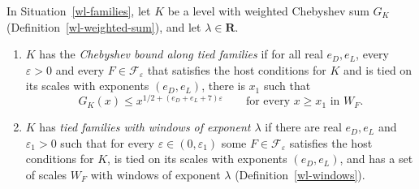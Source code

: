 \begin{definition}\label{wl-family-conditions}
In Situation~\ref{wl-families}, let $K$ be a level with weighted Chebyshev
sum $G_K$ (Definition~\ref{wl-weighted-sum}), and let $\lambda\in\mathbf R$.
\begin{enumerate}
\item $K$ has the \emph{Chebyshev bound along tied families} if for all real
  $e_D,e_L$, every $\varepsilon>0$ and every $F\in\mathcal F_\varepsilon$ that
  satisfies the host conditions for $K$ and is tied on its scales with
  exponents $(e_D,e_L)$, there is $x_1$ such that
  \[
   G_K(x)\leq x^{1/2+(e_D+e_L+7)\varepsilon}\qquad\text{for every }x\geq x_1\text{ in }W_F.
  \]
\item $K$ has \emph{tied families with windows of exponent $\lambda$} if
  there are real $e_D,e_L$ and $\varepsilon_1>0$ such that for every
  $\varepsilon\in(0,\varepsilon_1)$ some $F\in\mathcal F_\varepsilon$
  satisfies the host conditions for $K$, is tied on its scales with exponents
  $(e_D,e_L)$, and has a set of scales $W_F$ with windows of exponent
  $\lambda$ (Definition~\ref{wl-windows}).
\end{enumerate}
\end{definition}

